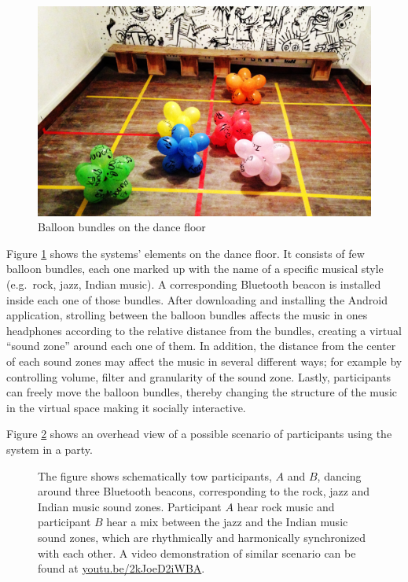 \documentclass[a4paper,11pt]{article}
\begin{document}
\begin{figure}[!htb]
	\includegraphics[width=\linewidth]{balloons}
	\caption{Balloon bundles on the dance floor}\label{fig:balloons}
\end{figure}

Figure \ref{fig:balloons} shows the systems' elements on the dance floor.
It consists of few balloon bundles, each one marked up with the name of a specific musical style (e.g.\ rock, jazz, Indian music).
A corresponding Bluetooth beacon is installed inside each one of those bundles.
After downloading and installing the Android application, strolling between the balloon bundles affects the music in ones headphones according to the relative distance from the bundles, creating a virtual ``sound zone'' around each one of them.
In addition, the distance from the center of each sound zones may affect the music in several different ways; for example by controlling volume, filter and granularity of the sound zone.
Lastly, participants can freely move the balloon bundles, thereby changing the structure of the music in the virtual space making it socially interactive.

Figure \ref{fig:sys:participant_view} shows an overhead view of a possible scenario of participants using the system in a party.

\begin{figure}[!htb]
	\centering
	\def\svgwidth{0.9\textwidth}
	
	\caption{The figure shows schematically tow participants, $A$ and $B$, dancing around three Bluetooth beacons, corresponding to the rock, jazz and Indian music sound zones. Participant $A$ hear rock music and participant $B$ hear a mix between the jazz and the Indian music sound zones, which are rhythmically and harmonically synchronized with each other. A video demonstration of similar scenario can be found at \href{http://youtu.be/2kJoeD2iWBA}{youtu.be/2kJoeD2iWBA}.}\label{fig:sys:participant_view}
\end{figure}
\end{document}

